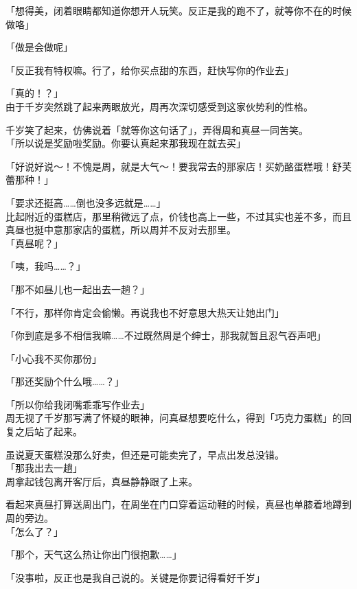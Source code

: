 「想得美，闭着眼睛都知道你想开人玩笑。反正是我的跑不了，就等你不在的时候做咯」

「做是会做呢」

「反正我有特权嘛。行了，给你买点甜的东西，赶快写你的作业去」

「真的！？」\\

由于千岁突然跳了起来两眼放光，周再次深切感受到这家伙势利的性格。

千岁笑了起来，仿佛说着「就等你这句话了」，弄得周和真昼一同苦笑。\\

「所以说是奖励啦奖励。你要认真起来那我现在就去买」

「好说好说～！不愧是周，就是大气～！要我常去的那家店！买奶酪蛋糕哦！舒芙蕾那种！」

「要求还挺高……倒也没多远就是……」\\

比起附近的蛋糕店，那里稍微远了点，价钱也高上一些，不过其实也差不多，而且真昼也挺中意那家店的蛋糕，所以周并不反对去那里。\\

「真昼呢？」

「咦，我吗……？」

「那不如昼儿也一起出去一趟？」

「不行，那样你肯定会偷懒。再说我也不好意思大热天让她出门」

「你到底是多不相信我嘛……不过既然周是个绅士，那我就暂且忍气吞声吧」

「小心我不买你那份」

「那还奖励个什么哦……？」

「所以你给我闭嘴乖乖写作业去」\\

周无视了千岁那写满了怀疑的眼神，问真昼想要吃什么，得到「巧克力蛋糕」的回复之后站了起来。

虽说夏天蛋糕没那么好卖，但还是可能卖完了，早点出发总没错。\\

「那我出去一趟」\\

周拿起钱包离开客厅后，真昼静静跟了上来。

看起来真昼打算送周出门，在周坐在门口穿着运动鞋的时候，真昼也单膝着地蹲到周的旁边。\\

「怎么了？」

「那个，天气这么热让你出门很抱歉……」

「没事啦，反正也是我自己说的。关键是你要记得看好千岁」

